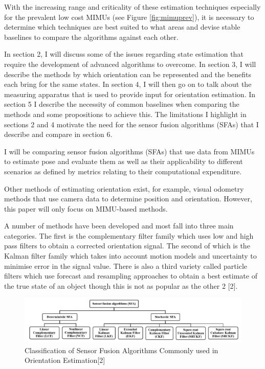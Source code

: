 \documentclass[10pt]{report}
\begin{document}
With the increasing range and criticality of these estimation techniques especially for the prevalent low cost MIMUs (see Figure \ref{fig:mimuprev}), it is necessary to determine which techniques are best suited to what areas and devise stable baselines to compare the algorithms against each other.

In section 2, I will discuss some of the issues regarding state estimation that require the development of advanced algorithms to overcome. In section 3, I will describe the methods by which orientation can be represented and the benefits each bring for the same states. In section 4, I will then go on to talk about the measuring apparatus that is used to provide input for orientation estimation. In section 5 I describe the necessity of common baselines when comparing the methods and some propositions to achieve this. The limitations I highlight in sections 2 and 4 motivate the need for the sensor fusion algorithms (SFAs) that I describe and compare in section 6.

I will be comparing sensor fusion algorithms (SFAs) that use data from MIMUs to estimate pose and evaluate them as well as their applicability to different scenarios as defined by metrics relating to their computational expenditure.

Other methods of estimating orientation exist, for example, visual odometry methods that use camera data to determine position and orientation. However, this paper will only focus on MIMU-based methods.

A number of methods have been developed and most fall into three main categories. The first is the complementary filter family which uses low and high pass filters to obtain a corrected orientation signal. The second of which is the Kalman filter family which takes into account motion models and uncertainty to minimise error in the signal value. There is also a third variety called particle filters which use forecast and resampling approaches to obtain a best estimate of the true state of an object though this is not as popular as the other 2 [2].

\begin{figure}[!h]
  \caption{Classification of Sensor Fusion Algorithms Commonly used in Orientation Estimation[2]}
  \centering
  \label{fig:sfas}
  \includegraphics[width=1\textwidth]{sfas.PNG}
\end{figure}
\end{document}
